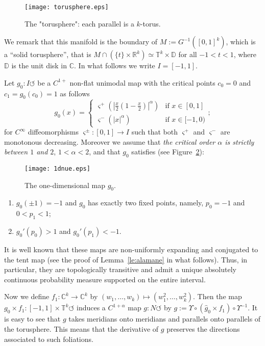 \documentclass[reqno,12pt,a4paper]{amsart}
\theoremstyle{plain}
\theoremstyle{definition}
\begin{document}
\begin{figure}[htpb]
  \centering{}
  \texttt{[image: torusphere.eps]}
  \caption{The "torusphere": each parallel is a $k$-torus.}
  \label{fig:torusph-each-meridi}
\end{figure}

We remark that this manifold is the boundary of
$M:=G^{-1}([0,1]^k)$, which is a ``solid torusphere'', that
is $M\cap(\{t\}\times{{\mathbb R}}^k) \simeq {{\mathbb T}}^k\times{{\mathbb D}}$ for all
$-1<t<1$, where ${{\mathbb D}}$ is the unit disk in ${{\mathbb C}}$.
In what follows we write $I= [-1, 1]$.

Let  $g_0: I \circlearrowleft$ be a $C^{1+}$ non-flat
unimodal map with the critical points $c_0=0$ and
$c_1=g_0(c_0)=1$ as follows
$$
g_0(x)=
\begin{cases}
  \varsigma^+\left( 
    \left|\frac{x}2\left(1-\frac{x}2\right)\right|^\alpha
  \right) 
  & \text{if   } x\in[0,1]\\
  \varsigma^-(|x|^\alpha) & \text{if } x\in[-1,0)
\end{cases};
$$
for $C^\infty$ diffeomorphisms $\varsigma^\pm:[0,1]\to I$ such
that both $\varsigma^+$ and $\varsigma^-$ are monotonous
decreasing. Moreover we assume that \emph{the critical order
$\alpha$ is strictly between $1$ and $2$}, $1<\alpha<2$, and
that $g_0$ satisfies (see Figure~\ref{fig:1dnue}):
\begin{figure}[htbp]
\begin{center}
  \texttt{[image: 1dnue.eps]}
\end{center}
\caption{The one-dimensional map $g_0$.}
  \label{fig:1dnue}
\end{figure}
\begin{enumerate}
\item $g_0(\pm1)=-1$ and $g_0$ has exactly two fixed points,
  namely, $p_0=-1$ and $0<p_1<1$;
\item $g_0'( p_0) > 1$ and $g_0'(p_1)<-1$.
\end{enumerate}

It is well known that these maps are non-uniformly
expanding and conjugated to the tent map (see the proof of
Lemma~\ref{le:alamane} in what follows). Thus, in particular,
they are topologically transitive and admit a unique
absolutely continuous probability measure supported on the
entire interval.

Now we define $f_1: {{\mathbb C}}^k\to {{\mathbb C}}^k$ by
$(w_1,\dots,w_k)\mapsto (w_1^2,\dots,w_k^2).$ Then the map
$g_0\times f_1: [-1, 1]\times {{\mathbb T}}^k\circlearrowleft $
induces a $C^{1+\alpha}$ map $g : N \circlearrowleft$ by
$
g:=\Upsilon \circ (\hat g_0\times f_1 ) \circ \Upsilon^{-1}.
$
It is easy to see that $g$ takes meridians onto meridians
and parallels onto parallels of the torusphere. This means
that the derivative of $g$ preserves the directions
associated to such foliations.
\end{document}
